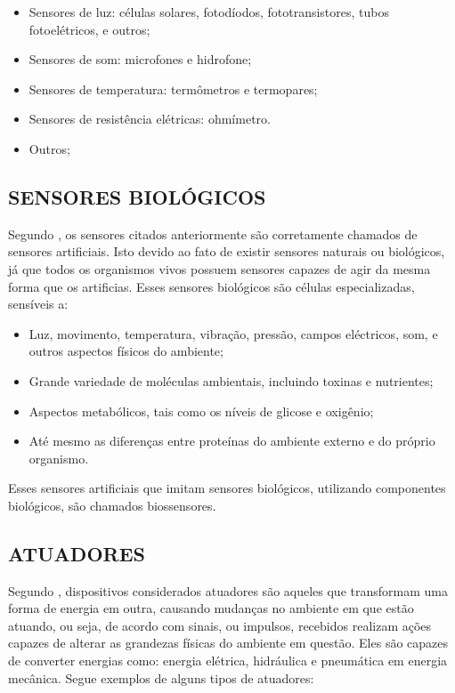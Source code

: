 \begin{itemize}
\item Sensores de luz: células solares, fotodíodos, fototransistores, tubos fotoelétricos, e outros;
\item Sensores de som: microfones e hidrofone;
\item Sensores de temperatura: termômetros e termopares;
\item Sensores de resistência elétricas: ohmímetro. 
\item Outros;
\end{itemize}

\subsection{SENSORES BIOLÓGICOS}
Segundo \cite{nomadusp2014}, os sensores citados anteriormente são corretamente chamados de sensores artificiais. Isto devido ao fato de existir sensores naturais ou biológicos, já que todos os organismos vivos possuem sensores capazes de agir da mesma forma que os artificias. Esses sensores biológicos são células especializadas, sensíveis a:

\begin{itemize}
\item Luz, movimento, temperatura, vibração, pressão, campos eléctricos, som, e outros aspectos físicos do ambiente;
\item Grande variedade de moléculas ambientais, incluindo toxinas e nutrientes;
\item Aspectos metabólicos, tais como os níveis de glicose e oxigênio;
\item Até mesmo as diferenças entre proteínas do ambiente externo e do próprio organismo.
\end{itemize}

Esses sensores artificiais que imitam sensores biológicos, utilizando componentes biológicos, são chamados biossensores.

\subsection{ATUADORES}
Segundo \cite{chironis1991mechanisms}, dispositivos considerados atuadores são aqueles que transformam uma forma de energia em outra, causando mudanças no ambiente em que estão atuando, ou seja, de acordo com sinais, ou impulsos, recebidos realizam ações capazes de alterar as grandezas físicas do ambiente em questão. Eles são capazes de converter energias como: energia elétrica, hidráulica e pneumática em energia mecânica. Segue exemplos de alguns tipos de atuadores:

